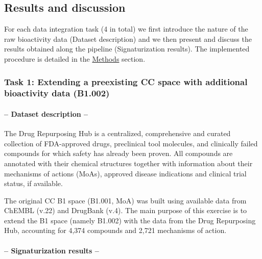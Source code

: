 \subsection{Results and discussion}


For each data integration task (4 in total) we first introduce the nature of the raw bioactivity data (Dataset description) and we then present and discuss the results obtained along the pipeline (Signaturization results). The implemented procedure is detailed in the \hyperref[Protocols_Methods]{Methods} section.




\subsubsection{Task 1: Extending a preexisting CC space with additional bioactivity data (B1.002)}

\paragraph{-- Dataset description --} \leavevmode

The Drug Repurposing Hub\cite{corsello_drug_2017} is a centralized, comprehensive and curated collection of FDA-approved drugs, preclinical tool molecules, and clinically failed compounds for which safety has already been proven. All compounds are annotated with their chemical structures together with information about their mechanisms of actions (MoAs), approved disease indications and clinical trial status, if available.

The original CC B1 space (B1.001, MoA) was built using available data from ChEMBL (v.22) and DrugBank (v.4). The main purpose of this exercise is to extend the B1 space (namely B1.002) with the data from the Drug Repurposing Hub, accounting for 4,374 compounds and 2,721 mechanisms of action.

\paragraph{-- Signaturization results --}  \leavevmode

